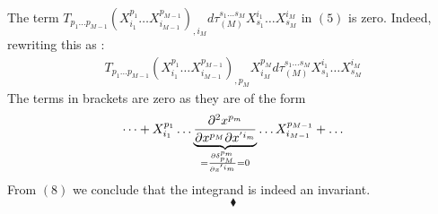 The term $ T^{}_{p_1 \dots p_{M-1}}\left(X^{p_1}_{i_1}\dots X^{p_{M-1}}_{i_{M-1}}\right)_{,i_M}d\tau_{(M)}^{s_1 \dots s_{M}}X^{i_1}_{s_1}\dots X^{i_{M}}_{s_{M}}$ in $ (5)$  is zero. Indeed, rewriting this as : 
\begin{align} T^{}_{p_1 \dots p_{M-1}}\left(X^{p_1}_{i_1}\dots X^{p_{M-1}}_{i_{M-1}}\right)_{,p_M}X^{p_M}_{i_M}d\tau_{(M)}^{s_1 \dots s_{M}}X^{i_1}_{s_1}\dots X^{i_{M}}_{s_{M}}
\end{align}
The terms in brackets are zero as they are of the form
\begin{align}
\dots + X^{p_1}_{i_1}\dots \underbrace{\pdv[2]{x^{p_{m}}}{x^{p_{M}}}{x^{'i_{m}}}}_{= \pdv{\delta^{p_m}_{p_M}}{x^{'i_{m}}}=0}\dots X^{p_{M-1}}_{i_{M-1}}+\dots 
\end{align} 
From $(8)$ we conclude that the integrand is indeed an invariant.
$$\blacklozenge$$
\newpage

